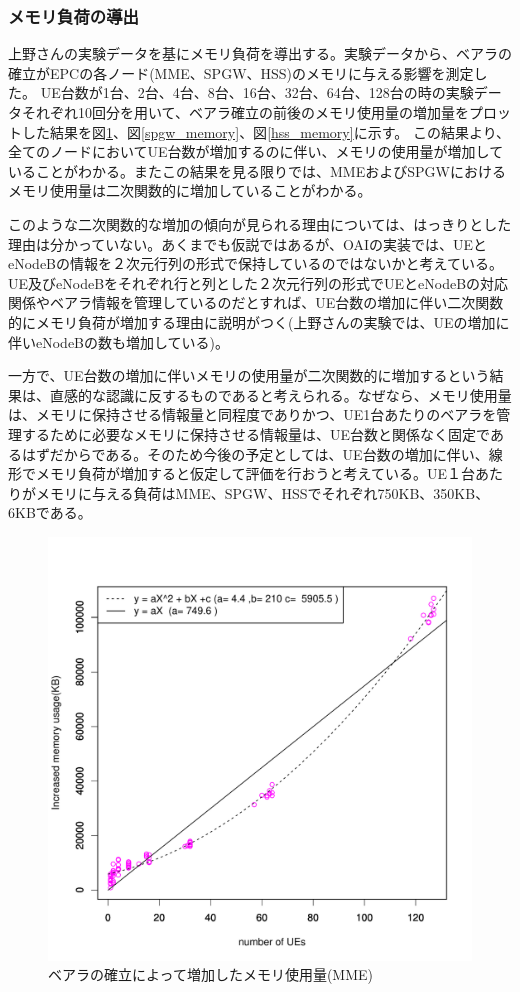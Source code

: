 \documentclass[a4j]{ujarticle}
\begin{document}
\subsubsection{メモリ負荷の導出}
\label{sec:memory}
上野さんの実験データを基にメモリ負荷を導出する。実験データから、ベアラの確立がEPCの各ノード(MME、SPGW、HSS)のメモリに与える影響を測定した。
UE台数が1台、2台、4台、8台、16台、32台、64台、128台の時の実験データそれぞれ10回分を用いて、ベアラ確立の前後のメモリ使用量の増加量をプロットした結果を図\ref{mme_memory}、図\ref{spgw_memory}、図\ref{hss_memory}に示す。
この結果より、全てのノードにおいてUE台数が増加するのに伴い、メモリの使用量が増加していることがわかる。またこの結果を見る限りでは、MMEおよびSPGWにおけるメモリ使用量は二次関数的に増加していることがわかる。

このような二次関数的な増加の傾向が見られる理由については、はっきりとした理由は分かっていない。あくまでも仮説ではあるが、OAIの実装では、UEとeNodeBの情報を２次元行列の形式で保持しているのではないかと考えている。UE及びeNodeBをそれぞれ行と列とした２次元行列の形式でUEとeNodeBの対応関係やベアラ情報を管理しているのだとすれば、UE台数の増加に伴い二次関数的にメモリ負荷が増加する理由に説明がつく(上野さんの実験では、UEの増加に伴いeNodeBの数も増加している)。

一方で、UE台数の増加に伴いメモリの使用量が二次関数的に増加するという結果は、直感的な認識に反するものであると考えられる。なぜなら、メモリ使用量は、メモリに保持させる情報量と同程度でありかつ、UE1台あたりのベアラを管理するために必要なメモリに保持させる情報量は、UE台数と関係なく固定であるはずだからである。そのため今後の予定としては、UE台数の増加に伴い、線形でメモリ負荷が増加すると仮定して評価を行おうと考えている。UE１台あたりがメモリに与える負荷はMME、SPGW、HSSでそれぞれ750KB、350KB、6KBである。


\begin{figure}[htbp]
	\centering
	\includegraphics[width=0.7\hsize]{mme_memory.pdf}
  \caption{ベアラの確立によって増加したメモリ使用量(MME)}
	\label{mme_memory}
\end{figure}
\end{document}
